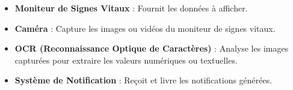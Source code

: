 \begin{itemize}
    \item \textbf{Moniteur de Signes Vitaux} : Fournit les données à afficher.
    \item \textbf{Caméra} : Capture les images ou vidéos du moniteur de signes vitaux.
    \item \textbf{OCR (Reconnaissance Optique de Caractères)} : Analyse les images capturées pour extraire les valeurs numériques ou textuelles.
    \item \textbf{Système de Notification} : Reçoit et livre les notifications générées.
\end{itemize}